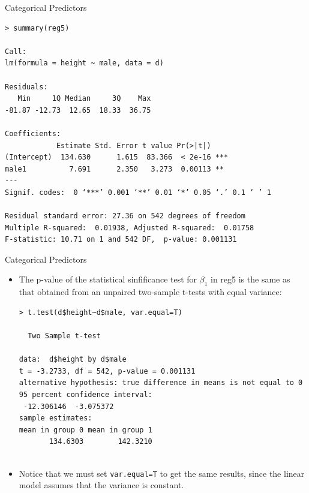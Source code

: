 \documentclass[handout]{beamer}
\begin{document}
\begin{frame}[fragile]{Categorical Predictors}
\scriptsize{ 

\begin{verbatim}
> summary(reg5)

Call:
lm(formula = height ~ male, data = d)

Residuals:
   Min     1Q Median     3Q    Max 
-81.87 -12.73  12.65  18.33  36.75 

Coefficients:
            Estimate Std. Error t value Pr(>|t|)    
(Intercept)  134.630      1.615  83.366  < 2e-16 ***
male1          7.691      2.350   3.273  0.00113 ** 
---
Signif. codes:  0 ‘***’ 0.001 ‘**’ 0.01 ‘*’ 0.05 ‘.’ 0.1 ‘ ’ 1

Residual standard error: 27.36 on 542 degrees of freedom
Multiple R-squared:  0.01938, Adjusted R-squared:  0.01758 
F-statistic: 10.71 on 1 and 542 DF,  p-value: 0.001131
\end{verbatim}



}
\end{frame}


\begin{frame}[fragile]{Categorical Predictors}
\scriptsize{ 
\begin{itemize}
\item The p-value of the statistical sinfificance test for $\beta_1$ in reg5  is the same as that obtained from an unpaired two-sample t-tests with equal variance:
\begin{verbatim}
> t.test(d$height~d$male, var.equal=T)

  Two Sample t-test

data:  d$height by d$male
t = -3.2733, df = 542, p-value = 0.001131
alternative hypothesis: true difference in means is not equal to 0
95 percent confidence interval:
 -12.306146  -3.075372
sample estimates:
mean in group 0 mean in group 1 
       134.6303        142.3210 
 
\end{verbatim}

\item Notice that we must set \verb+var.equal=T+ to get the same results, since the linear model assumes that the variance is constant.


\end{itemize}





}
\end{frame}
\end{document}
